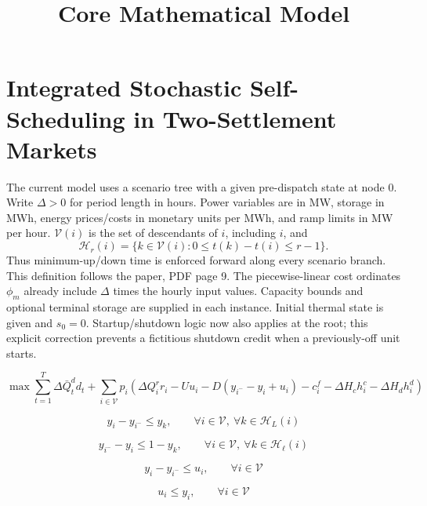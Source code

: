 \documentclass{article}
\title{Core Mathematical Model}
\date{}
\begin{document}
\maketitle

\section*{Integrated Stochastic Self-Scheduling in Two-Settlement Markets}


The current model uses a scenario tree with a given pre-dispatch state at node 0.
Write $\Delta>0$ for period length in hours. Power variables are in MW, storage in MWh,
energy prices/costs in monetary units per MWh, and ramp limits in MW per hour.
$\mathcal V(i)$ is the set of descendants of $i$, including $i$, and
\[
\mathcal H_r(i)=\{k\in\mathcal V(i):0\le t(k)-t(i)\le r-1\}.
\]
Thus minimum-up/down time is enforced forward along every scenario branch.
This definition follows the paper, PDF page 9.
The piecewise-linear cost ordinates $\phi_m$ already include $\Delta$ times the
hourly input values. Capacity bounds and optional terminal storage are supplied in each instance.
Initial thermal state is given and $s_0=0$. Startup/shutdown logic now also applies at the root;
this explicit correction prevents a fictitious shutdown credit when a previously-off unit starts.


\begin{equation}
\max
\sum_{t=1}^T \Delta\bar{Q}_t^d d_t
+ \sum_{i \in \mathcal{V}} p_i
\left(
\Delta Q_i^r r_i
- Uu_i
- D(y_{i^-} - y_i + u_i)
- c_i^f
- \Delta H_c h_i^c
- \Delta H_d h_i^d
\right)
\tag{TMS-DE}
\end{equation}

\begin{equation}
y_i - y_{i^-} \le y_k,
\qquad
\forall i \in \mathcal{V},\ \forall k \in \mathcal{H}_L(i)
\tag{1a}
\end{equation}

\begin{equation}
y_{i^-} - y_i \le 1 - y_k,
\qquad
\forall i \in \mathcal{V},\ \forall k \in \mathcal{H}_{\ell}(i)
\tag{1b}
\end{equation}

\begin{equation}
y_i - y_{i^-} \le u_i,
\qquad
\forall i \in \mathcal{V}
\tag{1c}
\end{equation}

\begin{equation}
u_i \le y_i,
\qquad
\forall i \in \mathcal{V}
\tag{1d-1}
\end{equation}
\end{document}

